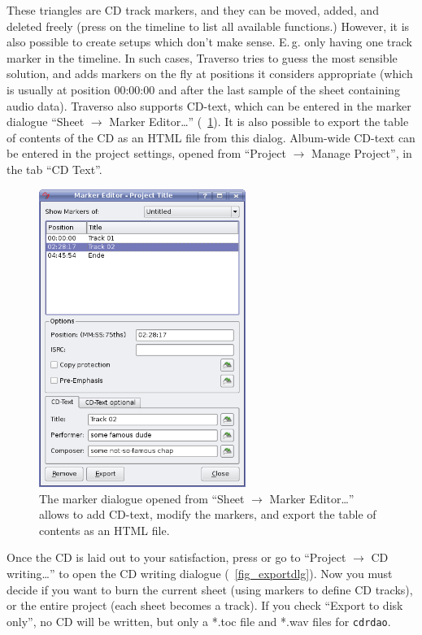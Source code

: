 These triangles are CD track markers, and they can be moved, added, and deleted freely (press  on the timeline to list all available functions.) However, it is also possible to create setups which don't make sense. E.\,g. only having one track marker in the timeline. In such cases, Traverso tries to guess the most sensible solution, and adds markers on the fly at positions it considers appropriate (which is usually at position 00:00:00 and after the last sample of the sheet containing audio data). Traverso also supports CD-text, which can be entered in the marker dialogue ``Sheet $\rightarrow$ Marker Editor\dots'' (\FigB~\ref{fig_marker-editor}). It is also possible to export the table of contents of the CD as an HTML file from this dialog. Album-wide CD-text can be entered in the project settings, opened from ``Project $\rightarrow$ Manage Project'', in the tab ``CD Text''.

\begin{figure}[ht]
 \centering\includegraphics[width=0.6\textwidth]{images/marker-editor}
 \caption{The marker dialogue opened from ``Sheet $\rightarrow$ Marker Editor\dots'' allows to add CD-text, modify the markers, and export the table of contents as an HTML file.}
 \label{fig_marker-editor}
\end{figure}

Once the CD is laid out to your satisfaction, press  or go to ``Project $\rightarrow$ CD writing\dots'' to open the CD writing dialogue (\FigB~\ref{fig_exportdlg}). Now you must decide if you want to burn the current sheet (using markers to define CD tracks), or the entire project (each sheet becomes a track). If you check ``Export to disk only'', no CD will be written, but only a *.toc file and *.wav files for \texttt{cdrdao}.

